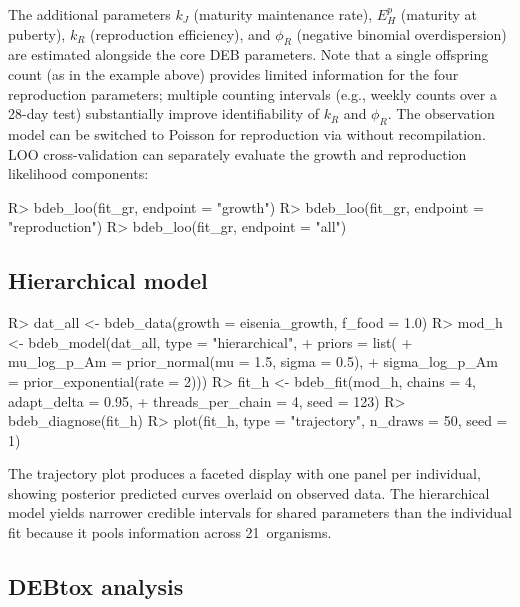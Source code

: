 \documentclass[article,shortnames]{jss}
\begin{document}
\noindent
The additional parameters $k_J$ (maturity maintenance rate), $E_H^p$
(maturity at puberty), $k_R$ (reproduction efficiency), and $\phi_R$
(negative binomial overdispersion) are estimated alongside the core
DEB parameters.  Note that a single offspring count (as in the
example above) provides limited information for the four
reproduction parameters; multiple counting intervals
(e.g., weekly counts over a 28-day test) substantially improve
identifiability of $k_R$ and $\phi_R$.  The observation model can
be switched to Poisson for reproduction via 
without recompilation.
LOO cross-validation can separately evaluate the growth and
reproduction likelihood components:

\begin{CodeChunk}
\begin{CodeInput}
R> bdeb_loo(fit_gr, endpoint = "growth")
R> bdeb_loo(fit_gr, endpoint = "reproduction")
R> bdeb_loo(fit_gr, endpoint = "all")
\end{CodeInput}
\end{CodeChunk}

\subsection{Hierarchical model} \label{sec:ex_hier}

\begin{CodeChunk}
\begin{CodeInput}
R> dat_all <- bdeb_data(growth = eisenia_growth, f_food = 1.0)
R> mod_h <- bdeb_model(dat_all, type = "hierarchical",
+    priors = list(
+      mu_log_p_Am    = prior_normal(mu = 1.5, sigma = 0.5),
+      sigma_log_p_Am = prior_exponential(rate = 2)))
R> fit_h <- bdeb_fit(mod_h, chains = 4, adapt_delta = 0.95,
+    threads_per_chain = 4, seed = 123)
R> bdeb_diagnose(fit_h)
R> plot(fit_h, type = "trajectory", n_draws = 50, seed = 1)
\end{CodeInput}
\end{CodeChunk}

The trajectory plot produces a faceted display with one panel per
individual, showing posterior predicted curves overlaid on observed data.
The hierarchical model yields narrower credible intervals for shared
parameters than the individual fit because it pools information across
21~organisms.

\subsection{DEBtox analysis} \label{sec:ex_debtox}
\end{document}
